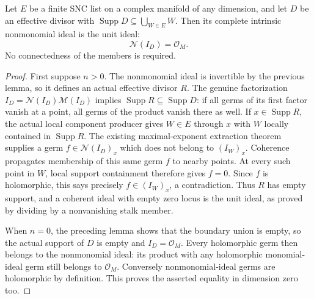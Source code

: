 \begin{theorem}
\label{hir:intrinsic-supported-nonmonomial-unit}
\leanok
Let $E$ be a finite SNC list on a complex manifold of any dimension,
and let $D$ be an effective divisor with
$\operatorname{Supp}D\subseteq\bigcup_{W\in E}W$.
Then its complete intrinsic nonmonomial ideal is the unit ideal:
\[
 \mathcal N(I_D)=\mathcal O_M.
\]
No connectedness of the members is required.
\end{theorem}
\begin{proof}
First suppose $n>0$.  The nonmonomial ideal is invertible by the previous
lemma, so it defines an actual effective divisor $R$.
The genuine factorization
$I_D=\mathcal N(I_D)\mathcal M(I_D)$ implies
$\operatorname{Supp}R\subseteq\operatorname{Supp}D$:
if all germs of its first factor vanish at a point, all germs of the
product vanish there as well.
If $x\in\operatorname{Supp}R$, the actual local component producer
gives $W\in E$ through $x$ with $W$ locally contained in
$\operatorname{Supp}R$.
The existing maximal-exponent extraction theorem supplies a germ
$f\in\mathcal N(I_D)_x$ which does not belong to $(I_W)_x$.
Coherence propagates membership of this same germ $f$ to nearby points.
At every such point in $W$, local support containment therefore gives
$f=0$.  Since $f$ is holomorphic, this says precisely
$f\in(I_W)_x$, a contradiction.
Thus $R$ has empty support, and a coherent ideal with empty zero locus
is the unit ideal, as proved by dividing by a nonvanishing stalk member.

When $n=0$, the preceding lemma shows that the boundary union is empty,
so the actual support of $D$ is empty and $I_D=\mathcal O_M$.
Every holomorphic germ then belongs to the nonmonomial ideal: its
product with any holomorphic monomial-ideal germ still belongs to
$\mathcal O_M$.  Conversely nonmonomial-ideal germs are holomorphic by
definition.  This proves the asserted equality in dimension zero too.
\end{proof}

